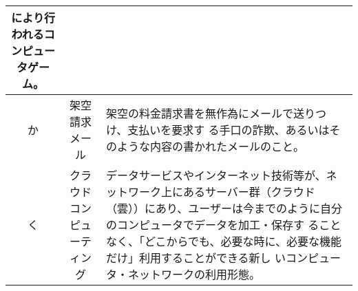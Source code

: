 \begin{table}[htb]
\begin{center}
\begin{tabular}{|c|c|p{10cm}|}
      により行われるコンピュータゲーム。 \\
      \hline
      か & 架空請求メール & 架空の料金請求書を無作為にメールで送りつけ、支払いを要求す
      る手口の詐欺、あるいはそのような内容の書かれたメールのこと。\\
      \hline
      く & クラウドコンピューティング & 
      データサービスやインターネット技術等が、ネットワーク上にあるサーバー群（クラウド
        （雲））にあり、ユーザーは今までのように自分のコンピュータでデータを加工・保存す
      ることなく、「どこからでも、必要な時に、必要な機能だけ」利用することができる新し
      いコンピュータ・ネットワークの利用形態。 \\
      \hline
    \end{tabular}
  \end{center}
\end{table}



